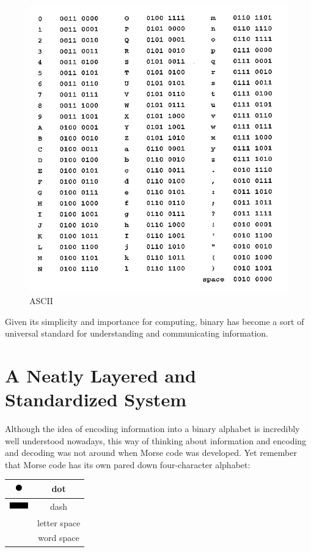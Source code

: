 \documentclass[UTF8]{book}
\newcommand*\thickdash{\includegraphics{thick-dash2}}
\newcommand*\thickdot{\includegraphics{thick-dot2}}
\begin{document}
\begin{CJK}{UTF8}{gbsn}
\begin{figure}[H]
\centering
\includegraphics[width=0.8\linewidth]{ascii-binary-chart}
\caption{ASCII}
\end{figure}

Given its simplicity and importance for computing, binary has become a sort of universal standard for understanding and communicating information.

\section{A Neatly Layered and Standardized System}

Although the idea of encoding information into a binary alphabet is incredibly well understood nowadays, this way of thinking about information and encoding and decoding was not around when Morse code was developed. Yet remember that Morse code has its own pared down four-character alphabet:

\begin{center}
\begin{tabular}{cc}
\thickdot & dot \\
\hline
\thickdash & dash \\
\hline
[short pause] & letter space \\
\hline
[long pause] & word space \\
\end{tabular}
\end{center}


\end{CJK}
\end{document}
